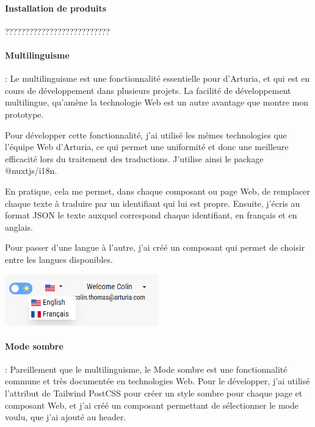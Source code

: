 \documentclass[francais]{rapportPFE}  %
\begin{document}
\paragraph{Installation de produits} ??????????????????????????
\paragraph{Multilinguisme}: Le multilinguisme est une fonctionnalité essentielle pour d'Arturia, et qui est en cours de développement dans plusieurs projets. La facilité de développement multilingue, qu'amène la technologie Web est un autre avantage que montre mon prototype.

Pour développer cette fonctionnalité, j'ai utilisé les mêmes technologies que l'équipe Web d'Arturia, ce qui permet une uniformité et donc une meilleure efficacité lors du traitement des traductions. J'utilise ainsi le package @nuxtjs/i18n. 

En pratique, cela me permet, dans chaque composant ou page Web, de remplacer chaque texte à traduire par un identifiant qui lui est propre. Ensuite, j'écris au format JSON le texte auxquel correspond chaque identifiant, en français et en anglais. 

Pour passer d'une langue à l'autre, j'ai créé un composant qui permet de choisir entre les langues disponibles.

\begin{center}
	\centering
	\includegraphics[width=0.5\textwidth]{graphics/languages.png}
	\begin{tiny}
	\end{tiny}
	\label{fig}
\end{center}

\paragraph{Mode sombre}: Pareillement que le multilinguisme, le Mode sombre est une fonctionnalité commune et très documentée en technologies Web. Pour le développer, j'ai utilisé l'attribut de Tailwind PostCSS pour créer un style sombre pour chaque page et composant Web, et j'ai créé un composant permettant de sélectionner le mode voulu, que j'ai ajouté au header. 
\end{document}
